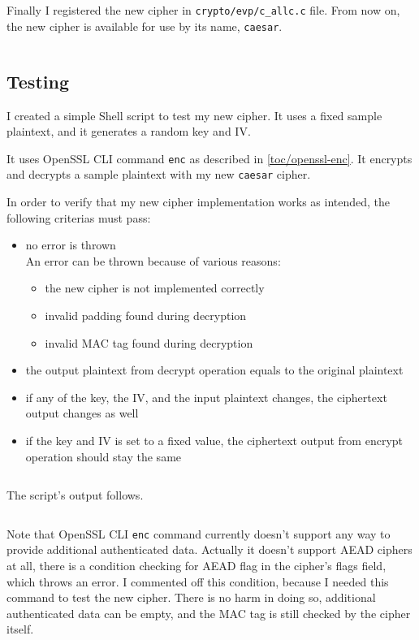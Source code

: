 \inputminted{c}{code/openssl/crypto/evp/caesar/e_caesar_ctrl.c}

Finally I registered the new cipher in \texttt{crypto/evp/c\_allc.c} file. From now on, the new cipher is available for use by its name, \texttt{caesar}.

\inputminted{c}{code/openssl/crypto/evp/c_allc.c}

\subsection{Testing}

I created a simple Shell script to test my new cipher. It uses a fixed sample plaintext, and it generates a random key and IV.

It uses OpenSSL CLI command \texttt{enc} as described in \autoref{toc/openssl-enc}. It encrypts and decrypts a sample plaintext with my new \texttt{caesar} cipher.

In order to verify that my new cipher implementation works as intended, the following criterias must pass:

\begin{itemize}
  \item no error is thrown \\ An error can be thrown because of various reasons:
  \begin{itemize}
    \item the new cipher is not implemented correctly
    \item invalid padding found during decryption
    \item invalid MAC tag found during decryption
  \end{itemize}
  \item the output plaintext from decrypt operation equals to the original plaintext
  \item if any of the key, the IV, and the input plaintext changes, the ciphertext output changes as well
  \item if the key and IV is set to a fixed value, the ciphertext output from encrypt operation should stay the same
\end{itemize}

\inputminted{bash}{code/test-enc.sh}

The script's output follows.

\inputminted{text}{code/test-enc.sh.out}

Note that OpenSSL CLI \texttt{enc} command currently doesn't support any way to provide additional authenticated data. Actually it doesn't support AEAD ciphers at all, there is a condition checking for AEAD flag in the cipher's flags field, which throws an error. I commented off this condition, because I needed this command to test the new cipher. There is no harm in doing so, additional authenticated data can be empty, and the MAC tag is still checked by the cipher itself.

